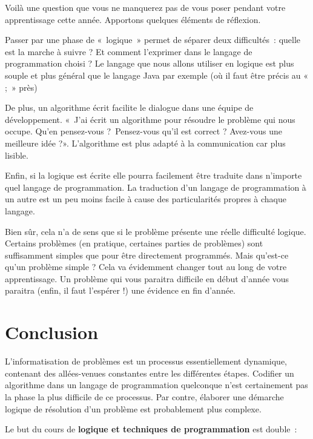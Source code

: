 	Voilà une question que vous ne manquerez pas de vous poser pendant votre
	apprentissage cette année. Apportons quelques éléments de réflexion.

	\begin{liste}
	\item
		Passer par une phase de «~logique~» permet de séparer deux difficultés~:
		quelle est la marche à suivre ? Et comment l'exprimer
		dans le langage de programmation choisi ? Le langage que nous allons
		utiliser en logique est plus souple et plus général que le langage Java
		par exemple (où il faut être précis au « ;~» près)
	\item
		De plus, un algorithme écrit facilite le dialogue dans une équipe de
		développement. «~J'ai écrit un algorithme pour
		résoudre le problème qui nous occupe. Qu'en
		pensez-vous ?~Pensez-vous qu'il est correct ?
		Avez-vous une meilleure idée ?». L'algorithme est plus adapté à la
		communication car plus lisible.
	\item
		Enfin, si la logique est écrite elle pourra facilement être traduite
		dans n'importe quel langage de programmation. La
		traduction d'un langage de programmation à un autre
		est un peu moins facile à cause des particularités propres à chaque
		langage.
	\end{liste}

	Bien sûr, cela n'a de sens que si le problème présente
	une réelle difficulté logique. Certains problèmes (en pratique,
	certaines parties de problèmes) sont suffisamment simples que pour être
	directement programmés. Mais qu'est-ce
	qu'un problème simple ? Cela va évidemment changer
	tout au long de votre apprentissage. Un problème qui vous paraitra
	difficile en début d'année vous paraitra (enfin, il
	faut l'espérer !) une évidence en fin
	d'année.

\section{Conclusion}

	L’informatisation de problèmes est un processus essentiellement
	dynamique, contenant des allées-venues constantes entre les différentes
	étapes. Codifier un algorithme dans un langage de programmation
	quelconque n’est certainement pas la phase la plus difficile de ce
	processus. Par contre, élaborer une démarche logique de résolution d’un
	problème est probablement plus complexe.
	
	Le but du cours de \textbf{logique et techniques de programmation} est
	double~:

